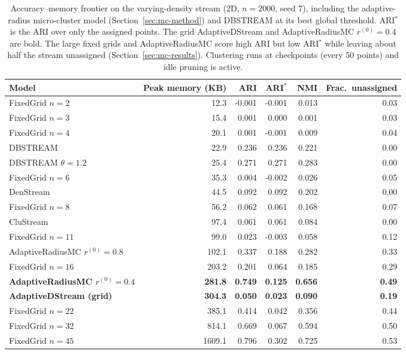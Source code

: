 \documentclass[11pt]{article}
\begin{document}
\begin{table}[h]
\centering
\caption{Accuracy--memory frontier on the varying-density stream (2D, $n=2000$, seed 7), including the adaptive-radius micro-cluster model (Section~\ref{sec:mc-method}) and DBSTREAM at its best global threshold. ARI$^*$ is the ARI over only the assigned points. The grid AdaptiveDStream and AdaptiveRadiusMC $r^{(0)}{=}0.4$ are bold. The large fixed grids and AdaptiveRadiusMC score high ARI but low ARI$^*$ while leaving about half the stream unassigned (Section~\ref{sec:mc-results}). Clustering runs at checkpoints (every 50 points) and idle pruning is active.}
\label{tab:frontier}
\begin{tabular}{lrrrrr}
\toprule
Model & Peak memory (KB) & ARI & ARI$^*$ & NMI & Frac.\ unassigned \\
\midrule
FixedGrid $n{=}2$ & 12.3 & -0.001 & -0.001 & 0.013 & 0.03 \\
FixedGrid $n{=}3$ & 15.4 & 0.001 & 0.000 & 0.001 & 0.03 \\
FixedGrid $n{=}4$ & 20.1 & 0.001 & -0.001 & 0.009 & 0.04 \\
DBSTREAM & 22.9 & 0.236 & 0.236 & 0.221 & 0.00 \\
DBSTREAM $\theta{=}1.2$ & 25.4 & 0.271 & 0.271 & 0.283 & 0.00 \\
FixedGrid $n{=}6$ & 35.3 & 0.004 & -0.002 & 0.026 & 0.05 \\
DenStream & 44.5 & 0.092 & 0.092 & 0.202 & 0.00 \\
FixedGrid $n{=}8$ & 56.2 & 0.062 & 0.061 & 0.168 & 0.07 \\
CluStream & 97.4 & 0.061 & 0.061 & 0.084 & 0.00 \\
FixedGrid $n{=}11$ & 99.0 & 0.023 & -0.003 & 0.058 & 0.12 \\
AdaptiveRadiusMC $r^{(0)}{=}0.8$ & 102.1 & 0.337 & 0.188 & 0.282 & 0.33 \\
FixedGrid $n{=}16$ & 203.2 & 0.201 & 0.064 & 0.185 & 0.29 \\
\textbf{AdaptiveRadiusMC $r^{(0)}{=}0.4$} & \textbf{281.8} & \textbf{0.749} & \textbf{0.125} & \textbf{0.656} & \textbf{0.49} \\
\textbf{AdaptiveDStream (grid)} & \textbf{304.3} & \textbf{0.050} & \textbf{0.023} & \textbf{0.090} & \textbf{0.19} \\
FixedGrid $n{=}22$ & 385.1 & 0.414 & 0.042 & 0.356 & 0.44 \\
FixedGrid $n{=}32$ & 814.1 & 0.669 & 0.067 & 0.594 & 0.50 \\
FixedGrid $n{=}45$ & 1609.1 & 0.796 & 0.302 & 0.725 & 0.53 \\
\bottomrule
\end{tabular}
\end{table}
\end{document}
